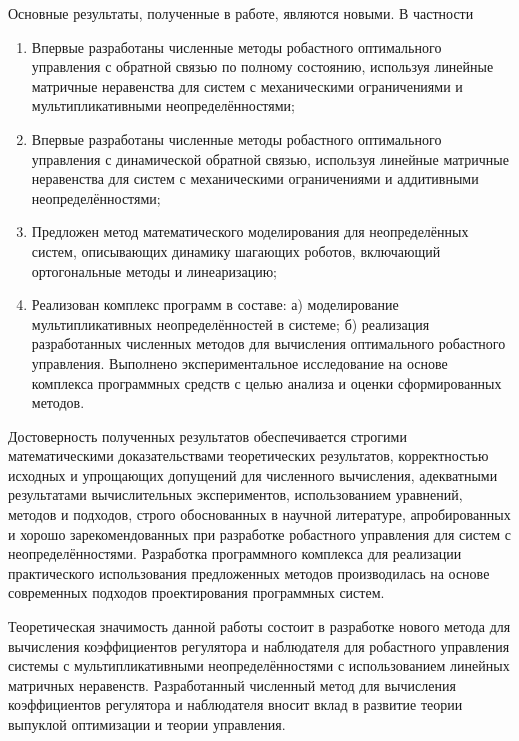 Основные результаты, полученные в работе, являются новыми. В частности
\begin{enumerate}[beginpenalty=10000] %
	\item Впервые разработаны численные методы робастного оптимального управления с обратной связью по полному состоянию, используя линейные матричные неравенства для систем с механическими ограничениями и мультипликативными неопределённостями;
	\item Впервые разработаны численные методы робастного оптимального управления с динамической обратной связью, используя линейные матричные неравенства для систем с механическими ограничениями и аддитивными неопределённостями;
	\item Предложен метод математического моделирования для неопределённых систем, описывающих динамику шагающих роботов, включающий ортогональные методы и линеаризацию;
	\item Реализован комплекс программ в составе: а) моделирование мультипликативных неопределённостей в системе; б) реализация разработанных численных методов для вычисления оптимального робастного управления. Выполнено экспериментальное исследование на основе комплекса программных средств с целью анализа и оценки сформированных методов.
\end{enumerate}

{\probation}

Достоверность полученных результатов обеспечивается строгими математическими доказательствами теоретических результатов, корректностью исходных и упрощающих допущений для численного вычисления, адекватными результатами вычислительных экспериментов, использованием уравнений, методов и подходов, строго обоснованных в научной литературе, апробированных и хорошо зарекомендованных при разработке робастного управления для систем с неопределённостями. Разработка программного комплекса для реализации практического использования предложенных методов производилась на основе современных подходов проектирования программных систем.

{\influence} 

Теоретическая значимость данной работы состоит в разработке нового метода для вычисления коэффициентов регулятора и наблюдателя для робастного управления системы с мультипликативными неопределённостями с использованием линейных матричных неравенств. Разработанный численный метод для вычисления коэффициентов регулятора и наблюдателя вносит вклад в развитие теории выпуклой оптимизации и теории управления.

